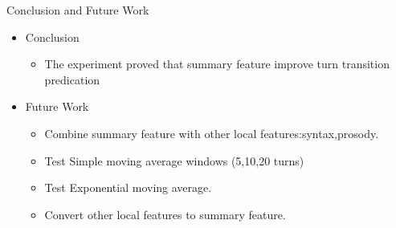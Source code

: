 \documentclass[t]{beamer}
\begin{document}
\begin{frame}{Conclusion and Future Work}
  \begin{itemize}
     \item Conclusion 
       \begin{itemize}
          \item The experiment proved that summary feature improve turn transition predication
       \end{itemize}
  \item Future Work
     \begin{itemize}
        \item Combine summary feature with other local features:syntax,prosody.
        \item Test Simple moving average windows (5,10,20 turns)
        \item Test Exponential moving average.
        \item Convert other local features to summary feature.
     \end{itemize}
  \end{itemize}
\end{frame}



%
%
%
%
%
%

\end{document}
